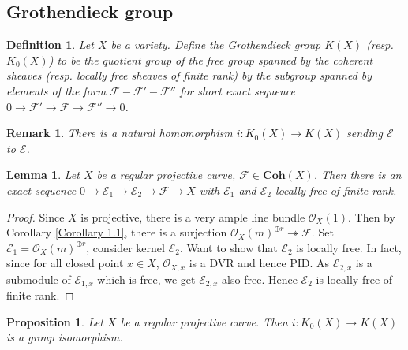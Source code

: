 \documentclass{ctexart}
\newtheorem{definition}{Definition}[section]
\newtheorem{remark}{Remark}[section]
\newtheorem{proposition}{Proposition}[section]
\newtheorem{lemma}{Lemma}[section]
\newcommand{\coherent}{\mathbf{Coh}}
\begin{document}
\subsection{Grothendieck group}
\label{subsection:Riemann-Roch_for_curves_Grothendieck_group}

\begin{definition}
    Let $X$ be a variety.
    Define the Grothendieck group $K(X)$ (resp. $K_{0}(X)$) to be the quotient group of the free group spanned by the coherent sheaves (resp. locally free sheaves of finite rank) by the subgroup spanned by elements of the form $\mathcal{F} - \mathcal{F}' - \mathcal{F}''$ for short exact sequence $0 \rightarrow \mathcal{F}' \rightarrow \mathcal{F} \rightarrow \mathcal{F}'' \rightarrow 0$.
\end{definition}
\begin{remark}
    There is a natural homomorphism $i: K_{0}(X) \rightarrow K(X)$ sending $\overline{\mathcal{E}}$ to $\overline{\mathcal{E}}$.
\end{remark}
\begin{lemma}
    Let $X$ be a regular projective curve, $\mathcal{F}\in \coherent (X)$.
    Then there is an exact sequence $0 \rightarrow \mathcal{E}_{1} \rightarrow \mathcal{E}_{2} \rightarrow \mathcal{F} \rightarrow X$ with $\mathcal{E}_{1}$ and $\mathcal{E}_{2}$ locally free of finite rank.
    \label{Lemma 3.6}
\end{lemma}
\begin{proof}
    Since $X$ is projective, there is a very ample line bundle $\mathcal{O}_{X}(1)$.
    Then by Corollary \ref{Corollary 1.1}, there is a surjection $\mathcal{O}_{X}(m)^{\oplus r} \twoheadrightarrow \mathcal{F}$.
    Set $\mathcal{E}_{1} = \mathcal{O}_{X}(m)^{\oplus r}$, consider kernel $\mathcal{E}_{2}$.
    Want to show that $\mathcal{E}_{2}$ is locally free.
    In fact, since for all closed point $x\in X$, $\mathcal{O}_{X, x}$ is a DVR and hence PID.
    As $\mathcal{E}_{2, x}$ is a submodule of $\mathcal{E}_{1, x}$ which is free, we get $\mathcal{E}_{2, x}$ also free.
    Hence $\mathcal{E}_{2}$ is locally free of finite rank. 
\end{proof}
\begin{proposition}
    Let $X$ be a regular projective curve.
    Then $i: K_{0}(X) \rightarrow K(X)$ is a group isomorphism.
    \label{Proposition 3.4}
\end{proposition}
\end{document}
